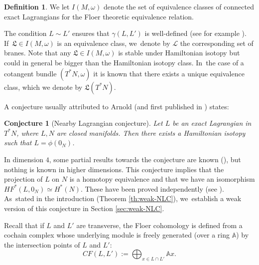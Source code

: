 \documentclass[JEP,XML,SOM,Unicode,NoFloatCountersInSection,published]{cedram}
\newtheorem{Conjecture}[thm]{Conjecture}
\theoremstyle{definition}
\newtheorem{defn}[thm]{Definition}
\newcommand {\LL}{{\mathcal L}}
\newcommand{\fL}{\mathfrak {L}}
\begin{document}
\begin{defn} We let $I(M,\omega)$ denote the set of equivalence classes of connected exact Lagrangians for the Floer theoretic equivalence relation.
\end{defn}

The condition $L\sim L'$ ensures that $\gamma(L,L')$ is well-defined (see for example \cite{shelukhin-sc-viterbo}). If~$\fL\in I(M,\omega)$ is an equivalence class, we~denote by $\LL$ the corresponding set of branes. Note that any $\fL\in I(M,\omega)$ is stable under Hamiltonian isotopy but could in general be bigger than the Hamiltonian isotopy class. In~the case of a cotangent bundle $(T^*N, \omega)$ it is known \cite{Fukaya-Seidel-Smith, Kragh-Abouzaid} that there exists a unique equivalence class, which we denote by $\fL(T^*N)$.

A conjecture usually attributed to Arnold (and first published in \cite{Lalonde-Sikorav}) states:
\begin{Conjecture}[Nearby Lagrangian conjecture]\label{conj:NLC}
Let $L$ be an exact Lagrangian in $T^{*}N$, where $L,N$ are closed manifolds. Then there exists a Hamiltonian isotopy such that $L=\phi (0_{N})$.
\end{Conjecture}
In dimension $4$, some partial results towards the conjecture are known (\cite{Eliashberg-Polterovich-local-2-knots, Hind, Kim-unknotedness, Dimitroglou-nearby-lagrangian}), but nothing is known in higher dimensions.
This conjecture implies that the projection of $L$ on $N$ is a homotopy equivalence and that we have an isomorphism $HF^{*}(L,0_{N})\simeq H^{*}(N)$. These have been proved independently (see \cite{Fukaya-Seidel-Smith, Kragh-Abouzaid}). As~stated in the introduction (Theorem \ref{th:weak-NLC}), we~establish a weak version of this conjecture in Section \ref{sec:weak-NLC}.

Recall that if $L$ and $L'$ are transverse, the Floer cohomology is defined from a cochain complex whose underlying module is freely generated (over a ring $\mathbb{A}$) by the intersection points of $L$ and $L'$:
\[
CF(L,L'):=\bigoplus_{x\in L\cap L'}\mathbb{A}x.
\]
\end{document}
